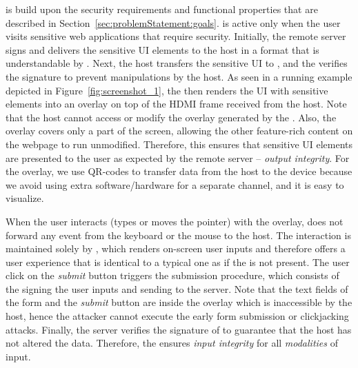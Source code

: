 \name is build upon the security requirements and functional properties that are described in Section~\ref{sec:problemStatement:goals}. %
\device is active only when the user visits sensitive web applications that require \name security.
Initially, the remote server signs and delivers the sensitive UI elements to the host in a format that is understandable by \device. Next, the host transfers the sensitive UI to \device, and the \device verifies the signature to prevent manipulations by the host. As seen in a running example depicted in Figure~\ref{fig:screenshot_1}, the \device then renders the UI with sensitive elements into an overlay on top of the HDMI frame received from the host. Note that the host cannot access or modify the overlay generated by the \device. Also, the overlay covers only a part of the screen, allowing the other feature-rich content on the webpage to run unmodified. Therefore, this ensures that sensitive UI elements are presented to the user as expected by the remote server -- \emph{output integrity}. For the overlay, we use QR-codes to transfer data from the host to the device because we avoid using extra software/hardware for a separate channel, and it is easy to visualize.

When the user interacts (types or moves the pointer) with the overlay, \device does not forward any event from the keyboard or the mouse to the host. The interaction is maintained solely by \device, which renders on-screen user inputs and therefore offers a user experience that is identical to a typical one as if the \device is not present. The user click on the \emph{submit} button triggers the submission procedure, which consists of the \device signing the user inputs and sending to the server. Note that the text fields of the form and the \emph{submit} button are inside the overlay which is inaccessible by the host, hence the attacker cannot execute the early form submission or clickjacking attacks. Finally, the server verifies the signature of \device to guarantee that the host has not altered the data. Therefore, the \device ensures \emph{input integrity} for all \emph{modalities} of input.

